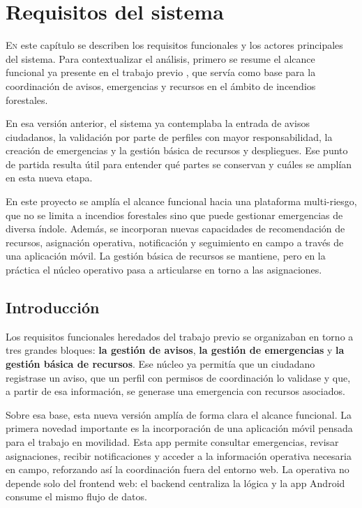 \chapter{Requisitos del sistema}
\label{chap:requisitos}

\lettrine{E}{n} este capítulo se describen los requisitos funcionales y los actores principales del sistema. Para contextualizar el análisis, primero se resume el alcance funcional ya presente en el trabajo previo \cite{TFGAdrianGarcia2025}, que servía como base para la coordinación de avisos, emergencias y recursos en el ámbito de incendios forestales.

En esa versión anterior, el sistema ya contemplaba la entrada de avisos ciudadanos, la validación por parte de perfiles con mayor responsabilidad, la creación de emergencias y la gestión básica de recursos y despliegues. Ese punto de partida resulta útil para entender qué partes se conservan y cuáles se amplían en esta nueva etapa.

En este proyecto se amplía el alcance funcional hacia una plataforma multi-riesgo, que no se limita a incendios forestales sino que puede gestionar emergencias de diversa índole. Además, se incorporan nuevas capacidades de recomendación de recursos, asignación operativa, notificación y seguimiento en campo a través de una aplicación móvil. La gestión básica de recursos se mantiene, pero en la práctica el núcleo operativo pasa a articularse en torno a las asignaciones.

\section{Introducción}

Los requisitos funcionales heredados del trabajo previo se organizaban en torno a tres grandes bloques: \textbf{la gestión de avisos}, \textbf{la gestión de emergencias} y \textbf{la gestión básica de recursos}. Ese núcleo ya permitía que un ciudadano registrase un aviso, que un perfil con permisos de coordinación lo validase y que, a partir de esa información, se generase una emergencia con recursos asociados.

Sobre esa base, esta nueva versión amplía de forma clara el alcance funcional. La primera novedad importante es la incorporación de una aplicación móvil pensada para el trabajo en movilidad. Esta app permite consultar emergencias, revisar asignaciones, recibir notificaciones y acceder a la información operativa necesaria en campo, reforzando así la coordinación fuera del entorno web. La operativa no depende solo del frontend web: el backend centraliza la lógica y la app Android consume el mismo flujo de datos.


